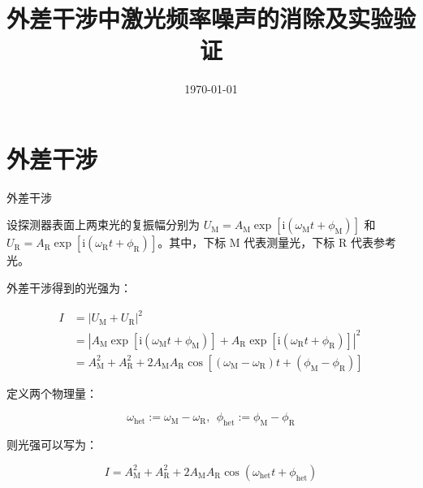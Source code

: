 \documentclass{beamer}
\title{外差干涉中激光频率噪声的消除及实验验证}
\institute{兰州大学物理科学与技术学院}
\date{\today}
\begin{document}
\songti
\maketitle
\footnotesize

\section{外差干涉}
\begin{frame}{外差干涉}
    \footnotesize
    
设探测器表面上两束光的复振幅分别为 $U_{\mathrm{M}}=A_{\mathrm{M}}\exp\left[\mathrm{i}\left(\omega_{\mathrm{M}}t+\phi_{\mathrm{M}} \right)  \right] $ 和 $U_{\mathrm{R}}=A_{\mathrm{R}}\exp\left[\mathrm{i}\left(\omega_{\mathrm{R}}t+\phi_{\mathrm{R}}\right)  \right] $。其中，下标 $\mathrm{M} $ 代表测量光，下标 $\mathrm{R} $ 代表参考光。

外差干涉得到的光强为：

$$
\begin{aligned}
I
&=|U_{\mathrm{M}}+U_{\mathrm{R}} |^2 \\
&=\left|A_{\mathrm{M}}\exp\left[\mathrm{i}\left(\omega_{\mathrm{M}}t+\phi_{\mathrm{M}} \right)  \right] + A_{\mathrm{R}}\exp\left[\mathrm{i}\left(\omega_{\mathrm{R}}t+\phi_{\mathrm{R}}\right)  \right] \right|^2 \\
&=A_{\mathrm{M}}^2 + A_{\mathrm{R}}^2 + 2A_{\mathrm{M}}A_{\mathrm{R}}\cos[(\omega_{\mathrm{M}} - \omega_{\mathrm{R}})t + (\phi_{\mathrm{M}}-\phi_{\mathrm{R}})]
\end{aligned}
$$

定义两个物理量：

$$
\omega_{\mathrm{het}}
:=\omega_{\mathrm{M}} - \omega_{\mathrm{R}},~~
\phi_{\mathrm{het}}
:=\phi_{\mathrm{M}} - \phi_{\mathrm{R}}
$$

则光强可以写为：

$$
I
=A_{\mathrm{M}}^2 + A_{\mathrm{R}}^2 + 2A_{\mathrm{M}}A_{\mathrm{R}}\cos(\omega_{\mathrm{het}}t+\phi_{\mathrm{het}})
$$

\end{frame}
\end{document}
